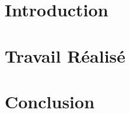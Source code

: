 \documentclass[a4paper, 12pt]{report}
\begin{document}
\begin{large}
\thispagestyle{empty}
\tableofcontents
\end{large}
\setcounter{page}{0}

\part{Introduction}




\part{Travail Réalisé}


\part{Conclusion}

\end{document}

